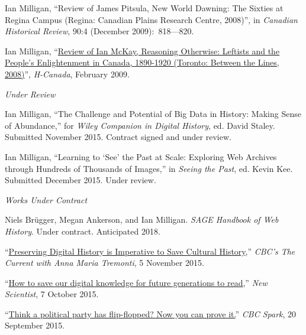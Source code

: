 \documentclass[11pt,article,oneside]{memoir}
\begin{document}
\ind Ian Milligan, ``Review of James Pitsula, New World Dawning: The Sixties at Regina Campus (Regina: Canadian Plains Research Centre, 2008)'', in \emph{Canadian Historical Review}, 90:4 (December 2009):~818---820.

\ind Ian Milligan, ``\href{http://www.h-net.org/reviews/showrev.php?id=24198}{Review of Ian McKay, Reasoning Otherwise: Leftists and the People's Enlightenment in Canada, 1890-1920 (Toronto: Between the Lines, 2008)}'', \emph{H-Canada}, February 2009.

\bigskip 

\noindent\emph{Under Review\vspace{0.05in}}

\ind Ian Milligan, ``The Challenge and Potential of Big Data in History: Making Sense of Abundance,'' for \emph{Wiley Companion in Digital History}, ed. David Staley. Submitted November 2015. Contract signed and under review.

\ind Ian Milligan, ``Learning to `See' the Past at Scale: Exploring Web Archives through Hundreds of Thousands of Images,'' in \emph{Seeing the Past}, ed. Kevin Kee. Submitted December 2015. Under review.

\bigskip

\noindent\emph{Works Under Contract \vspace{0.05in}}

\ind Niels Br\"ugger, Megan Ankerson, and Ian Milligan. \emph{SAGE Handbook of Web History}. Under contract. Anticipated 2018.

\bigskip


\medskip

\ind ``\href{http://www.cbc.ca/radio/thecurrent/the-current-for-november-5-2015-1.3305130/preserving-digital-history-is-imperative-to-save-cultural-history-1.3305263}{Preserving Digital History is Imperative to Save Cultural History},'' \emph{CBC's The Current with Anna Maria Tremonti}, 5 November 2015.

\ind ``\href{https://www.newscientist.com/article/mg22830422-900-how-to-save-our-digital-knowledge-for-future-generations-to-read/?utm_source=NSNS}{How to save our digital knowledge for future generations to read},'' \emph{New Scientist}, 7 October 2015.

\ind ``\href{http://www.cbc.ca/radio/spark/293-enhancing-books-wondering-where-the-time-went-and-more-1.3229541/think-a-political-party-has-flip-flopped-now-you-can-prove-it-1.3229550}{Think a political party has flip-flopped? Now you can prove it.}'' \emph{CBC Spark}, 20 September 2015. 
\end{document}
